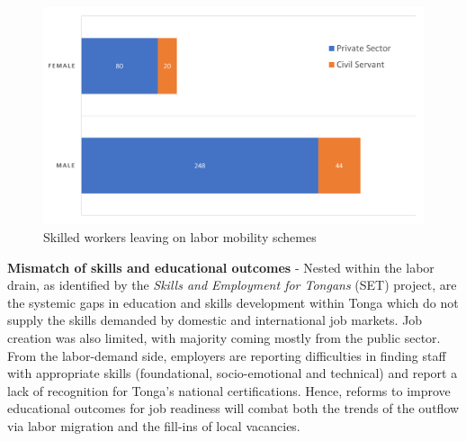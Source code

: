 \documentclass[9pt,a4paper,twocolumn,twoside]{tau-class/tau}
\begin{document}

    		
    		
    	\begin{figure}[H]
    		\centering
    		\includegraphics[width=0.9\columnwidth]{figures/Civil_data.png}
    		\caption{Skilled workers leaving on labor mobility schemes}
    		\label{fig:figure}
    	\end{figure}

   


\textbf{Mismatch of skills and educational outcomes} - Nested within the labor drain, as identified by the \textit{Skills and Employment for Tongans} (SET) project, are the systemic gaps in education and skills development within Tonga which do not supply the skills demanded by domestic and international job markets. Job creation was also limited, with majority coming mostly from the public sector. From the labor-demand side, employers are reporting difficulties in finding staff with appropriate skills  (foundational, socio-emotional and technical) and report a lack of recognition for Tonga's national certifications.  Hence, reforms to improve educational outcomes for job readiness will combat both the trends of the outflow via labor migration and the fill-ins of local vacancies. 
\end{document}

